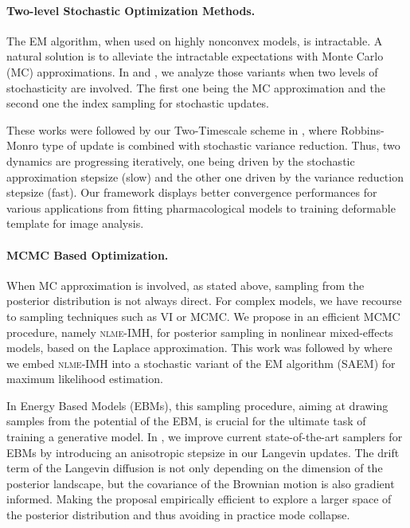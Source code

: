 \documentclass[twoside,11pt]{article}
\begin{document}
\vspace{0.08in}
\paragraph{Two-level Stochastic Optimization Methods.} 
The EM algorithm, when used on highly nonconvex models, is intractable.
A natural solution is to alleviate the intractable expectations with Monte Carlo (MC) approximations.
In \citep{karimi2019convergence} and \citep{karimi2020misso}, we analyze those variants when two levels of stochasticity are involved.
The first one being the MC approximation and the second one the index sampling for stochastic updates.

These works were followed by our Two-Timescale scheme in \citep{karimi2020tts}, where Robbins-Monro type of update is combined with stochastic variance reduction.
Thus, two dynamics are progressing iteratively, one being driven by the stochastic approximation stepsize (slow) and the other one driven by the variance reduction stepsize (fast).
Our framework displays better convergence performances for various applications from fitting pharmacological models to training deformable template for image analysis.

\vspace{0.08in}
\paragraph{MCMC Based Optimization.} 

When MC approximation is involved, as stated above, sampling from the posterior distribution is not always direct.
For complex models, we have recourse to sampling techniques such as VI or MCMC.
We propose in \citep{karimi2017non, karimi2018eff} an efficient MCMC procedure, namely \textsc{nlme-IMH}, for posterior sampling in nonlinear mixed-effects models, based on the Laplace approximation.
This work was followed by \citep{karimi2018fsaem} where we embed \textsc{nlme-IMH} into a stochastic variant of the EM algorithm (SAEM) for maximum likelihood estimation.

In Energy Based Models (EBMs), this sampling procedure, aiming at drawing samples from the potential of the EBM, is crucial for the ultimate task of training a generative model.
In \citep{karimi2020anila}, we improve current state-of-the-art samplers for EBMs by introducing an anisotropic stepsize in our Langevin updates.
The drift term of the Langevin diffusion is not only depending on the dimension of the posterior landscape, but the covariance of the Brownian motion is also gradient informed. 
Making the proposal empirically efficient to explore a larger space of the posterior distribution and thus avoiding in practice mode collapse.
\end{document}
